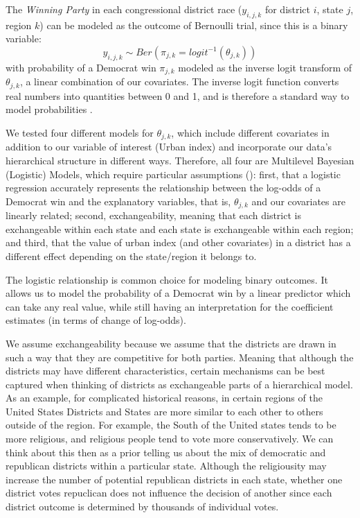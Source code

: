 \documentclass[12pt]{article}
\begin{document}
The \textit{Winning Party} in each congressional district race ($y_{i,j,k}$ for district $i$, state $j$, region $k$) can be modeled as the outcome of Bernoulli trial, since this is a binary variable: 
\begin{equation}
	y_{i,j,k} \sim Ber \left( \pi_{j,k} = logit^{-1}(\theta_{j,k})  \right)
\end{equation}
with probability of a Democrat win $\pi_{j,k}$ modeled as the inverse logit transform of $\theta_{j,k}$, a linear combination of our covariates. The inverse logit function converts real numbers into quantities between 0 and 1, and is therefore a standard way to model probabilities \parencite{logitlink}.


We tested four different models for $\theta_{j,k}$, which include different covariates in addition to our variable of interest (Urban index) and incorporate our data's hierarchical structure in different ways. Therefore, all four are Multilevel Bayesian (Logistic) Models, which require particular assumptions (\cite{BDA}): 
first, that a logistic regression accurately represents the relationship between the log-odds of a Democrat win and the explanatory variables, that is, $\theta_{j,k}$ and our covariates are linearly related; second, exchangeability, meaning that each district is exchangeable within each state and each state is exchangeable within each region; and third, that the value of urban index (and other covariates) in a district has a different effect depending on the state/region it belongs to.


The logistic relationship is common choice for modeling binary outcomes. It allows us to model the probability of a Democrat win by a linear predictor which can take any real value, while still having an interpretation for the coefficient estimates (in terms of change of log-odds).


We assume exchangeability because we assume that the districts are drawn in such a way that they are competitive for both parties. Meaning that although the districts may have different characteristics, certain mechanisms can be best captured when thinking of districts as exchangeable parts of  a hierarchical model. 
As an example, for complicated historical reasons, in certain regions of the United States Districts and States are more similar to each other to others outside of the region. For example, the South of the United states tends to be more religious, and religious people tend to vote more conservatively. We can think about this then as a prior telling us about the mix of democratic and republican districts within a particular state. Although the religiousity may increase the number of potential republican districts in each state, whether one district votes repuclican does not influence the decision of another since each district outcome is determined by thousands of individual votes. 
\end{document}
